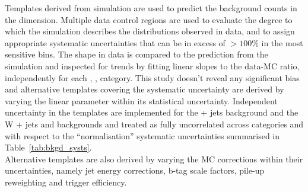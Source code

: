 Templates derived from simulation are used to predict the background
counts in the \mht dimension. Multiple data control regions are used
to evaluate the degree to which the simulation describes the \mht
distributions observed in data, and to assign appropriate systematic
uncertainties that can be in excess of $>100\%$ in the most sensitive
\mht bins. 
The \mht shape in data is compared to the prediction from the simulation 
and inspected for trends by fitting linear slopes to the data-MC ratio, 
independently for each \njet, \nb, \scalht category. 
This study doesn't reveal any significant bias and alternative templates 
covering the systematic uncertainty are derived by varying the 
linear parameter within its statistical uncertainty. 
Independent uncertainty in the templates are implemented for
the \znunu + jets background and the W + jets and \ttbar backgrounds
and treated as fully uncorrelated across categories 
and with respect to the ``normalisation'' systematic
uncertainties summarised in Table~\ref{tab:bkgd_systs}. \\
Alternative \mht templates are also derived by varying the MC corrections within their uncertainties, 
namely jet energy corrections, b-tag scale factors, pile-up reweighting and trigger efficiency.


